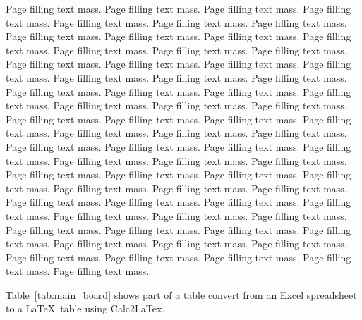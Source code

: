 \documentclass[12pt,a4paper,twoside,openright]{book}
\begin{document}
Page filling text mass. Page filling text mass. Page filling text mass. Page filling text mass. Page filling text mass. Page filling text mass. Page filling text mass. Page filling text mass. Page filling text mass. Page filling text mass. Page filling text mass. Page filling text mass. Page filling text mass. Page filling text mass. Page filling text mass. Page filling text mass. Page filling text mass. Page filling text mass. Page filling text mass. Page filling text mass. Page filling text mass. Page filling text mass. Page filling text mass. Page filling text mass. Page filling text mass. Page filling text mass. Page filling text mass. Page filling text mass. Page filling text mass. Page filling text mass. Page filling text mass. Page filling text mass. Page filling text mass. Page filling text mass. Page filling text mass. Page filling text mass. Page filling text mass. Page filling text mass. Page filling text mass. Page filling text mass. Page filling text mass. Page filling text mass. Page filling text mass. Page filling text mass. Page filling text mass. Page filling text mass. Page filling text mass. Page filling text mass. Page filling text mass. Page filling text mass. Page filling text mass. Page filling text mass. Page filling text mass. Page filling text mass. Page filling text mass. Page filling text mass. Page filling text mass. Page filling text mass. Page filling text mass. Page filling text mass. Page filling text mass. Page filling text mass. Page filling text mass. Page filling text mass. Page filling text mass. Page filling text mass. Page filling text mass. Page filling text mass. 

Table~\ref{tab:main_board} shows part of a table convert from an Excel spreadsheet to a
\LaTeX\ table using Calc2LaTex.
\end{document}
